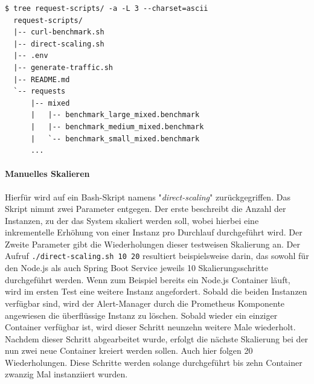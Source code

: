 \label{verb:scriptStruct}
\begin{minipage}{\linewidth}
\begin{lstlisting}[caption={Bash Skript - Struktur},style=bashStyle]
  $ tree request-scripts/ -a -L 3 --charset=ascii
  request-scripts/
  |-- curl-benchmark.sh
  |-- direct-scaling.sh
  |-- .env
  |-- generate-traffic.sh
  |-- README.md
  `-- requests
      |-- mixed
      |   |-- benchmark_large_mixed.benchmark
      |   |-- benchmark_medium_mixed.benchmark
      |   `-- benchmark_small_mixed.benchmark
      ...
\end{lstlisting}
\end{minipage}









\label{erklaerungDirScal}
\paragraph{Manuelles Skalieren}
Hierfür wird auf ein Bash-Skript namens "\emph{direct-scaling}" zurückgegriffen. Das Skript nimmt zwei Parameter entgegen. Der erste beschreibt die Anzahl der Instanzen, zu der das System skaliert werden soll, wobei hierbei eine inkrementelle Erhöhung von einer Instanz pro Durchlauf durchgeführt wird. Der Zweite Parameter gibt die Wiederholungen dieser testweisen Skalierung an. Der Aufruf \verb+./direct-scaling.sh 10 20+ resultiert beispielsweise darin, das sowohl für den Node.js als auch Spring Boot Service jeweils 10 Skalierungsschritte durchgeführt werden. Wenn zum Beispiel bereits ein Node.js Container läuft, wird im ersten Test eine weitere Instanz angefordert. Sobald die beiden Instanzen verfügbar sind, wird der Alert-Manager durch die Prometheus Komponente angewiesen die überflüssige Instanz zu löschen. Sobald wieder ein einziger Container verfügbar ist, wird dieser Schritt neunzehn weitere Male wiederholt. Nachdem dieser Schritt abgearbeitet wurde, erfolgt die nächste Skalierung bei der nun zwei neue Container kreiert werden sollen. Auch hier folgen 20 Wiederholungen. Diese Schritte werden solange durchgeführt bis zehn Container zwanzig Mal instanziiert wurden. 

